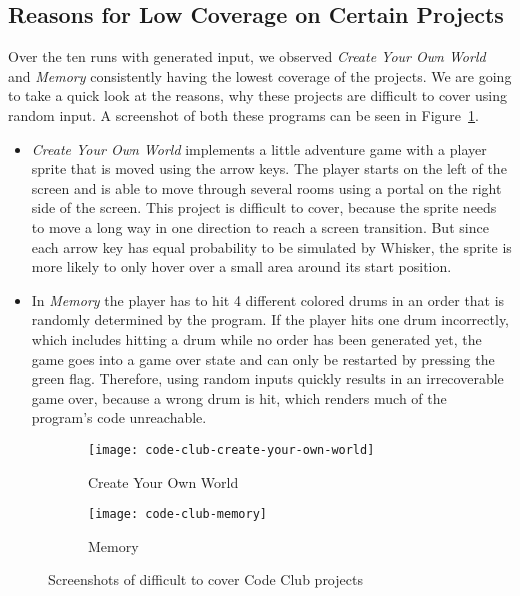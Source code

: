 \subsection{Reasons for Low Coverage on Certain Projects}

Over the ten runs with generated input, we observed \textit{Create Your Own World} and \textit{Memory} consistently having the lowest coverage of the projects.
We are going to take a quick look at the reasons, why these projects are difficult to cover using random input.
A screenshot of both these programs can be seen in Figure~\ref{fig:difficult_code_club_projects}.

\begin{itemize}
    \item \textit{Create Your Own World} implements a little adventure game with a player sprite that is moved using the arrow keys.
        The player starts on the left of the screen and is able to move through several rooms using a portal on the right side of the screen.
        This project is difficult to cover, because the sprite needs to move a long way in one direction to reach a screen transition.
        But since each arrow key has equal probability to be simulated by Whisker, the sprite is more likely to only hover over a small area around its start position.
    \item In \textit{Memory} the player has to hit 4 different colored drums in an order that is randomly determined by the program.
        If the player hits one drum incorrectly, which includes hitting a drum while no order has been generated yet,
        the game goes into a game over state and can only be restarted by pressing the green flag.
        Therefore, using random inputs quickly results in an irrecoverable game over,
        because a wrong drum is hit, which renders much of the program's code unreachable.
\end{itemize}

\begin{figure}[htpb]
    \centering

    \begin{subfigure}{.3\textwidth}
        \centering
        \texttt{[image: code-club-create-your-own-world]}
        \caption{Create Your Own World}
    \end{subfigure}
    \hspace{1mm}
    \begin{subfigure}{.3\textwidth}
        \centering
        \texttt{[image: code-club-memory]}
        \caption{Memory}
    \end{subfigure}%

    \caption{Screenshots of difficult to cover Code Club projects}
    \label{fig:difficult_code_club_projects}
\end{figure}


